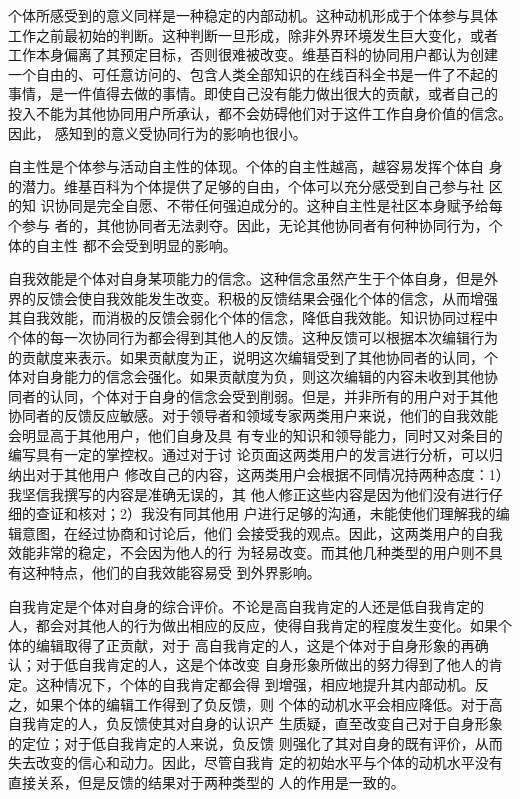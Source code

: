 个体所感受到的意义同样是一种稳定的内部动机。这种动机形成于个体参与具体
工作之前最初始的判断。这种判断一旦形成，除非外界环境发生巨大变化，或者
工作本身偏离了其预定目标，否则很难被改变。维基百科的协同用户都认为创建
一个自由的、可任意访问的、包含人类全部知识的在线百科全书是一件了不起的
事情，是一件值得去做的事情。即使自己没有能力做出很大的贡献，或者自己的
投入不能为其他协同用户所承认，都不会妨碍他们对于这件工作自身价值的信念。因此，
感知到的意义受协同行为的影响也很小。

自主性是个体参与活动自主性的体现。个体的自主性越高，越容易发挥个体自
身的潜力。维基百科为个体提供了足够的自由，个体可以充分感受到自己参与社
区的知
识协同是完全自愿、不带任何强迫成分的。这种自主性是社区本身赋予给每个参与
者的，其他协同者无法剥夺。因此，无论其他协同者有何种协同行为，个体的自主性
都不会受到明显的影响。

自我效能是个体对自身某项能力的信念。这种信念虽然产生于个体自身，但是外
界的反馈会使自我效能发生改变。积极的反馈结果会强化个体的信念，从而增强
其自我效能，而消极的反馈会弱化个体的信念，降低自我效能。知识协同过程中
个体的每一次协同行为都会得到其他人的反馈。这种反馈可以根据本次编辑行为
的贡献度来表示。如果贡献度为正，说明这次编辑受到了其他协同者的认同，个
体对自身能力的信念会强化。如果贡献度为负，则这次编辑的内容未收到其他协
同者的认同，个体对于自身的信念会受到削弱。但是，并非所有的用户对于其他
协同者的反馈反应敏感。对于领导者和领域专家两类用户来说，他们的自我效能
会明显高于其他用户，他们自身及具
有专业的知识和领导能力，同时又对条目的编写具有一定的掌控权。通过对于讨
论页面这两类用户的发言进行分析，可以归纳出对于其他用户
修改自己的内容，这两类用户会根据不同情况持两种态度：1）我坚信我撰写的内容是准确无误的，其
他人修正这些内容是因为他们没有进行仔细的查证和核对；2）我没有同其他用
户进行足够的沟通，未能使他们理解我的编辑意图，在经过协商和讨论后，他们
会接受我的观点。因此，这两类用户的自我效能非常的稳定，不会因为他人的行
为轻易改变。而其他几种类型的用户则不具有这种特点，他们的自我效能容易受
到外界影响。

自我肯定是个体对自身的综合评价。不论是高自我肯定的人还是低自我肯定的
人，都会对其他人的行为做出相应的反应，使得自我肯定的程度发生变化。如果个体的编辑取得了正贡献，对于
高自我肯定的人，这是个体对于自身形象的再确认；对于低自我肯定的人，这是个体改变
自身形象所做出的努力得到了他人的肯定。这种情况下，个体的自我肯定都会得
到增强，相应地提升其内部动机。反之，如果个体的编辑工作得到了负反馈，则
个体的动机水平会相应降低。对于高自我肯定的人，负反馈使其对自身的认识产
生质疑，直至改变自己对于自身形象的定位；对于低自我肯定的人来说，负反馈
则强化了其对自身的既有评价，从而失去改变的信心和动力。因此，尽管自我肯
定的初始水平与个体的动机水平没有直接关系，但是反馈的结果对于两种类型的
人的作用是一致的。

